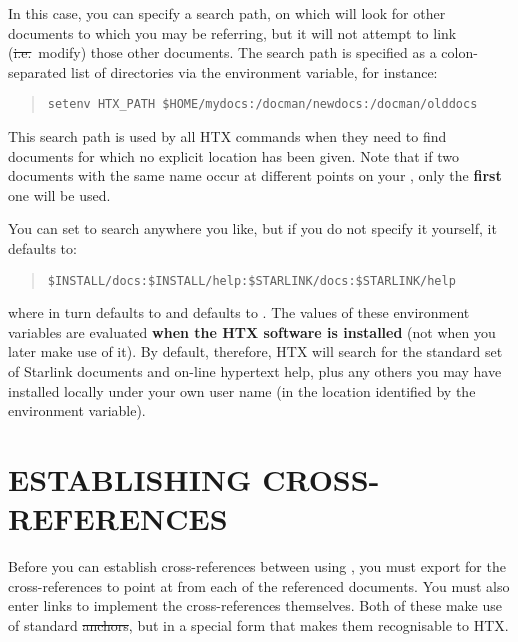 In this case, you can specify a search path, on which 
will look for other documents to which you may be referring, but it
will not attempt to link (\st{i.e.}\ modify) those other
documents. The search path is specified as a colon-separated list of
directories via the  environment variable, for instance:

\begin{quote}
\begin{verbatim}
setenv HTX_PATH $HOME/mydocs:/docman/newdocs:/docman/olddocs
\end{verbatim}
\end{quote}

This search path is used by all HTX commands when they need to find
documents for which no explicit location has been given.  Note that if
two documents with the same name occur at different points on your
, only the {\bf first} one will be used.

You can set  to search anywhere you like, but if you do not
specify it yourself, it defaults to:

\begin{quote}
\begin{verbatim}
$INSTALL/docs:$INSTALL/help:$STARLINK/docs:$STARLINK/help
\end{verbatim}
\end{quote}

where  in turn defaults to  and
 defaults to . The values of these environment
variables are evaluated {\bf when the HTX software is installed} (not
when you later make use of it). By default, therefore, HTX will search
for the standard set of Starlink documents and on-line hypertext help,
plus any others you may have installed locally under your own user
name (in the location identified by the  environment
variable).

\section{\label{sect:crossreferences}ESTABLISHING CROSS-REFERENCES}

Before you can establish cross-references between 
using , you must export  for the
cross-references to point at from each of the referenced
documents. You must also enter links to implement the cross-references
themselves. Both of these make use of standard 
\st{anchors}, but in a special form that makes them recognisable to
HTX.

